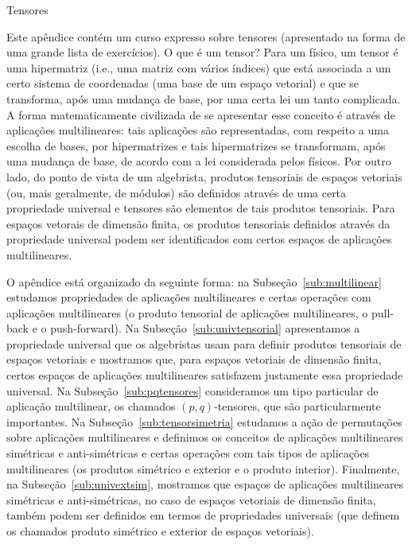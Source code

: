 \documentclass[oneside,11pt]{amsart}
\theoremstyle{remark}\newtheorem{exercise}{Exercício}[section]
\theoremstyle{plain}\newtheorem{teo}{Teorema}[section]
\theoremstyle{plain}\newtheorem{lem}[teo]{Lema}
\theoremstyle{plain}\newtheorem{prop}[teo]{Proposição}
\theoremstyle{definition}\newtheorem{defin}[teo]{Definição}
\theoremstyle{remark}\newtheorem{rem}[teo]{Observação}
\theoremstyle{definition}\newtheorem{example}[teo]{Exemplo}
\numberwithin{equation}{section}
\begin{document}
\begin{section}{Tensores}
\label{sec:tensores}

Este apêndice contém um curso expresso sobre tensores (apresentado na forma de uma grande lista de exercícios). O que é um tensor? Para um físico,
um tensor é uma hipermatriz (i.e., uma matriz com vários índices) que está associada a um certo sistema de coordenadas (uma base de um espaço vetorial)
e que se transforma, após uma mudança de base, por uma certa lei um tanto complicada. A forma matematicamente civilizada de se apresentar esse conceito é através
de aplicações multilineares: tais aplicações são representadas, com respeito a uma escolha de bases, por hipermatrizes e tais hipermatrizes se transformam,
após uma mudança de base, de acordo com a lei considerada pelos físicos. Por outro lado, do ponto de vista de um algebrista, produtos tensoriais de espaços vetoriais
(ou, mais geralmente, de módulos) são definidos através de uma certa propriedade universal e tensores são elementos de tais produtos tensoriais. Para
espaços vetorais de dimensão finita, os produtos tensoriais definidos através da propriedade universal podem ser identificados com certos espaços de aplicações
multilineares.

O apêndice está organizado da seguinte forma: na Subseção~\ref{sub:multilinear} estudamos propriedades de aplicações multilineares e certas operações
com aplicações multilineares (o produto tensorial de aplicações multilineares, o pull-back e o push-forward). Na Subseção~\ref{sub:univtensorial}
apresentamos a propriedade universal que os algebristas usam para definir produtos tensoriais de espaços vetoriais e mostramos que, para espaços vetoriais
de dimensão finita, certos espaços de aplicações multilineares satisfazem justamente essa propriedade universal.
Na Subseção~\ref{sub:pqtensores} consideramos um tipo particular de aplicação multilinear, os chamados $(p,q)$-tensores, que são particularmente importantes.
Na Subseção~\ref{sub:tensorsimetria} estudamos a ação de permutações sobre aplicações multilineares e definimos os conceitos de aplicações multilineares
simétricas e anti-simétricas e certas operações com tais tipos de aplicações multilineares (os produtos simétrico e exterior e o produto interior).
Finalmente, na Subseção~\ref{sub:univextsim}, mostramos que espaços de aplicações multilineares simétricas e anti-simétricas, no caso de
espaços vetoriais de dimensão finita,
também podem ser definidos em termos de propriedades universais (que definem os chamados produto simétrico e exterior de espaços vetoriais).


\end{section}
\end{document}
